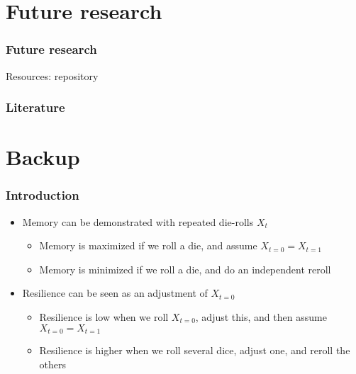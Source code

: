 \documentclass[hyperref={pdfpagelabels=false}]{beamer}
\begin{document}
\section{Future research}
\setcounter{subsection}{1}

\begin{frame}
\frametitle{Future research}
Resources: repository
\end{frame}

\begin{frame}[allowframebreaks]
\frametitle{Literature}


\end{frame}


\section{Backup} 
\setcounter{subsection}{1}

\begin{frame}
\frametitle{Introduction}
\begin{itemize}
\item Memory can be demonstrated with repeated die-rolls $X_t$
\begin{itemize}
\item Memory is maximized if we roll a die, and assume $X_{t=0} = X_{t=1}$
\item Memory is minimized if we roll a die, and do an independent reroll
\end{itemize}
\item Resilience can be seen as an adjustment of $X_{t=0}$
\begin{itemize}
\item Resilience is low when we roll $X_{t=0}$, adjust this, and then assume $X_{t=0} = X_{t=1}$
\item Resilience is higher when we roll several dice, adjust one, and reroll the others
\end{itemize}
\end{itemize}
\end{frame}
\end{document}
